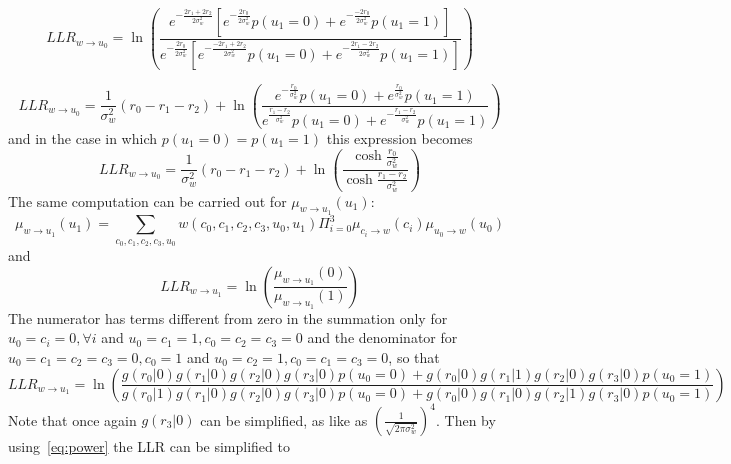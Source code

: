\documentclass[10pt]{article}
\begin{document}
\begin{equation}
	LLR_{w\rightarrow u_0} = \ln 
		\left( 
		\frac{
			e^{-\frac{2r_1+2r_2}{2\sigma_w^2}}
				\left[
					e^{-\frac{2r_0}{2\sigma_w^2}}p(u_1=0)+e^{-\frac{-2r_0}{2\sigma_w^2}}p(u_1=1)
				\right]
		}{
			e^{-\frac{2r_0}{2\sigma_w^2}}
				\left[
					e^{-\frac{-2r_1 + 2r_2}{2\sigma_w^2}}p(u_1=0)+e^{-\frac{2r_1 - 2r_2}{2\sigma_w^2}}p(u_1=1)
				\right]
		}
		\right)
\end{equation}


\begin{equation}
	LLR_{w\rightarrow u_0} = 
	\frac{1}{\sigma_w^2}(r_0 - r_1 - r_2) + 
	\ln 
		\left( 
		\frac{
			e^{-\frac{r_0}{\sigma_w^2}}p(u_1=0)+e^{\frac{r_0}{\sigma_w^2}}p(u_1=1)
		}{
			e^{\frac{r_1 - r_2}{\sigma_w^2}}p(u_1=0)+e^{-\frac{r_1 - r_2}{\sigma_w^2}}p(u_1=1)
		}
		\right)
\end{equation}
and in the case in which $p(u_1 = 0) = p(u_1 = 1)$ this expression becomes
\begin{equation}\label{eq:llru0final}
	LLR_{w\rightarrow u_0} = 
	\frac{1}{\sigma_w^2}(r_0 - r_1 - r_2) + 
	\ln 
		\left( 
		\frac{
			\cosh{\frac{r_0}{\sigma_w^2}}
		}{
			\cosh{\frac{r_1-r_2}{\sigma_w^2}}
		}
		\right)
\end{equation}
The same computation can be carried out for $\mu_{w\rightarrow u_1} (u_1)$:
\begin{equation}
	\mu_{w\rightarrow u_1} (u_1) = \sum_{c_0, c_1, c_2, c_3, u_0} w(c_0, c_1, c_2, c_3, u_0, u_1) \Pi_{i=0}^{3}\mu_{c_i\rightarrow w} (c_i) \mu_{u_0 \rightarrow w} (u_0) 
\end{equation}
and 
\begin{equation}
	LLR_{w\rightarrow u_1} = \ln \left( \frac{\mu_{w\rightarrow u_1} (0)}{\mu_{w\rightarrow u_1} (1)} \right)
\end{equation}
The numerator has terms different from zero in the summation only for $u_0 = c_i = 0, \forall i$ and $u_0 = c_1 = 1, c_0 = c_2 = c_3 = 0$ and the denominator for $u_0 = c_1 = c_2 = c_3 = 0, c_0 = 1$ and $u_0 = c_2 = 1, c_0 = c_1 = c_3 = 0$, so that
\begin{equation}
	LLR_{w\rightarrow u_1} = \ln 
		\left( 
		\frac{g(r_0|0)g(r_1|0)g(r_2|0)g(r_3|0)p(u_0=0) + g(r_0|0)g(r_1|1)g(r_2|0)g(r_3|0)p(u_0=1)}
		{g(r_0|1)g(r_1|0)g(r_2|0)g(r_3|0)p(u_0=0) + g(r_0|0)g(r_1|0)g(r_2|1)g(r_3|0)p(u_0=1)}
		\right)
\end{equation}
Note that once again $g(r_3|0)$ can be simplified, as like as $(\frac{1}{\sqrt{2\pi \sigma_w^2}})^4$. Then by using~\eqref{eq:power} the LLR can be simplified to
\end{document}
